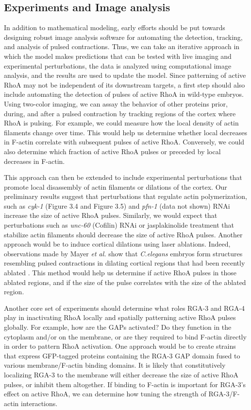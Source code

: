 \documentclass{ucetd}
\begin{document}
\subsection{Experiments and Image analysis} 
In addition to mathematical modeling, early efforts should be put towards designing robust image analysis software for automating the detection, tracking, and analysis of pulsed contractions.  Thus, we can take an iterative approach in which the model makes predictions that can be tested with live imaging and experimental perturbations, the data is analyzed using computational image analysis, and the results are used to update the model.  Since patterning of active RhoA may not be independent of its downstream targets,	a first step should also include automating the detection of pulses of active RhoA in wild-type embryos.  Using two-color imaging, we can assay the behavior of other proteins prior, during, and after a pulsed contraction by tracking regions of the cortex where RhoA is pulsing.  For example, we could measure how the local density of actin filaments change over time.  This would help us determine whether local decreases in F-actin correlate with subsequent pulses of active RhoA.  Conversely, we could also determine which fraction of active RhoA pulses or preceded by local decreases in F-actin.  


This approach can then be extended to include experimental perturbations that promote local disassembly of actin filaments or dilations of the cortex.  Our preliminary results suggest that perturbations that regulate actin polymerization, such as \textit{cyk-1} (Figure 3.4 and Figure 3.5) and \textit{pfn-1} (data not shown) RNAi increase the size of active RhoA pulses.  Similarly, we would expect that perturbations such as \textit{unc-60} (Cofilin) RNAi or jasplakinolide treatment that stabilize actin filaments should decrease the size of active RhoA pulses.  Another approach would be to induce cortical dilations using laser ablations.  Indeed, observations made by Mayer \textit{et al.} show that \textit{C.elegans} embryos form structures resembling pulsed contractions in dilating cortical regions that had been recently ablated \cite{Mayer:2010kt}.  This method would help us determine if active RhoA pulses in those ablated regions, and if the size of the pulse correlates with the size of the ablated region.


Another core set of experiments should determine what roles RGA-3 and RGA-4 play in inactivating RhoA locally and spatially patterning active RhoA pulses globally.  For example, how are the GAPs activated?  Do they function in the cytoplasm and/or on the membrane, or are they required to bind F-actin directly in order to pattern RhoA activation.  One approach would be to create strains that express GFP-tagged proteins containing the RGA-3 GAP domain fused to various membrane/F-actin binding domains.  It is likely that constitutively localizing RGA-3 to the membrane will either decrease the size of active RhoA pulses, or inhibit them altogether.  If binding to F-actin is important for RGA-3's effect on active RhoA, we can determine how tuning the strength of RGA-3/F-actin interactions.
			
\end{document}
